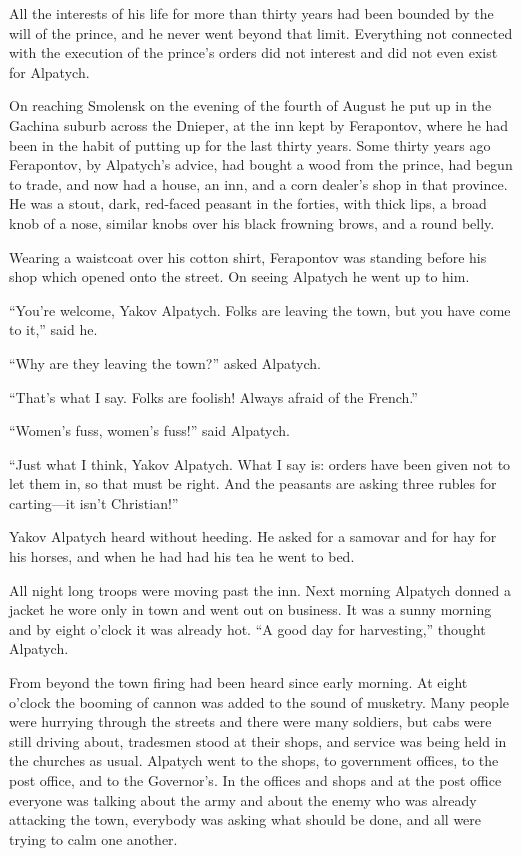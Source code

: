 All the interests of his life for more than thirty years had been
bounded by the will of the prince, and he never went beyond that
limit.  Everything not connected with the execution of the
prince's orders did not interest and did not even exist for
Alpatych.

On reaching Smolensk on the evening of the fourth of August he
put up in the Gachina suburb across the Dnieper, at the inn kept
by Ferapontov, where he had been in the habit of putting up for
the last thirty years.  Some thirty years ago Ferapontov, by
Alpatych's advice, had bought a wood from the prince, had begun
to trade, and now had a house, an inn, and a corn dealer's shop
in that province. He was a stout, dark, red-faced peasant in the
forties, with thick lips, a broad knob of a nose, similar knobs
over his black frowning brows, and a round belly.

Wearing a waistcoat over his cotton shirt, Ferapontov was
standing before his shop which opened onto the street. On seeing
Alpatych he went up to him.

``You're welcome, Yakov Alpatych. Folks are leaving the town, but
you have come to it,'' said he.

``Why are they leaving the town?'' asked Alpatych.

``That's what I say. Folks are foolish! Always afraid of the
French.''

``Women's fuss, women's fuss!'' said Alpatych.

``Just what I think, Yakov Alpatych. What I say is: orders have
been given not to let them in, so that must be right. And the
peasants are asking three rubles for carting---it isn't
Christian!''

Yakov Alpatych heard without heeding. He asked for a samovar and
for hay for his horses, and when he had had his tea he went to
bed.

All night long troops were moving past the inn. Next morning
Alpatych donned a jacket he wore only in town and went out on
business. It was a sunny morning and by eight o'clock it was
already hot. ``A good day for harvesting,'' thought Alpatych.

From beyond the town firing had been heard since early
morning. At eight o'clock the booming of cannon was added to the
sound of musketry. Many people were hurrying through the streets
and there were many soldiers, but cabs were still driving about,
tradesmen stood at their shops, and service was being held in the
churches as usual. Alpatych went to the shops, to government
offices, to the post office, and to the Governor's.  In the
offices and shops and at the post office everyone was talking
about the army and about the enemy who was already attacking the
town, everybody was asking what should be done, and all were
trying to calm one another.

